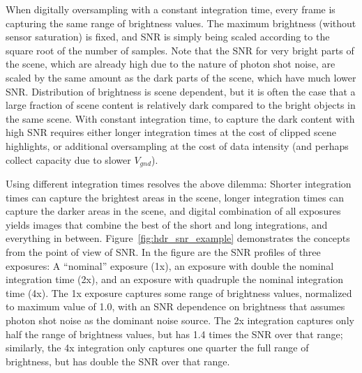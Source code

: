 \documentclass[]{spieman}  %
\begin{document}
When digitally oversampling with a constant integration time, every frame is capturing the same range of brightness values.  The maximum brightness (without sensor saturation) is fixed, and SNR is simply being scaled according to the square root of the number of samples.  Note that the SNR for very bright parts of the scene, which are already high due to the nature of photon shot noise, are scaled by the same amount as the dark parts of the scene, which have much lower SNR. Distribution of brightness is scene dependent, but it is often the case that a large fraction of scene content is relatively dark compared to the bright objects in the same scene.  With constant integration time, to capture the dark content with high SNR requires either longer integration times at the cost of clipped scene highlights, or additional oversampling at the cost of data intensity (and perhaps collect capacity due to slower $V_{gnd}$).

Using different integration times resolves the above dilemma: Shorter integration times can capture the brightest areas in the scene, longer integration times can capture the darker areas in the scene, and digital combination of all exposures yields images that combine the best of the short and long integrations, and everything in between.  Figure~\ref{fig:hdr_snr_example} demonstrates the concepts from the point of view of SNR. In the figure are the SNR profiles of three exposures:  A ``nominal'' exposure (1x), an exposure with double the nominal integration time (2x), and an exposure with quadruple the nominal integration time (4x). The 1x exposure captures some range of brightness values, normalized to maximum value of 1.0, with an SNR dependence on brightness that assumes photon shot noise as the dominant noise source. The 2x integration captures only half the range of brightness values, but has 1.4 times the SNR over that range; similarly, the 4x integration only captures one quarter the full range of brightness, but has double the SNR over that range.
\end{document}
